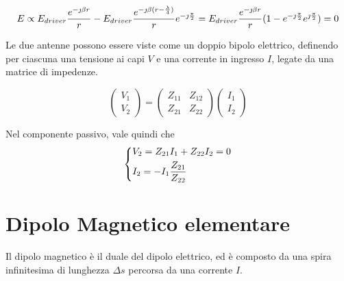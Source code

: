 \begin{equation}
	E
	\propto E_{driver} \frac{e^{-\jmath \beta r}}{r}
	- E_{driver} \frac{e^{-\jmath\beta(r-\frac{\lambda}{4})}}{r} e^{-\jmath\frac{\pi}{2}}
	= E_{driver}\frac{e^{-\jmath \beta r}}{r} (1-e^{-\jmath\frac{\pi}{2}} e^{\jmath\frac{\pi}{2}})
	= 0
\end{equation}

Le due antenne possono essere viste come un doppio bipolo elettrico, definendo per ciascuna una tensione ai capi $V$ e una corrente in ingresso $I$, legate da una matrice di impedenze.

\begin{equation}
	\left(
		\begin{array}{c}
			V_1 \\
			V_2
		\end{array}
	\right)
	= \left(
		\begin{array}{cc}
			Z_{11} & Z_{12} \\
			Z_{21} & Z_{22}
		\end{array}
	\right)
	\left(
		\begin{array}{cc}
			I_1 \\
			I_2
		\end{array}
	\right)
\end{equation}

Nel componente passivo, vale quindi che
\begin{equation}
	\begin{dcases}
		V_2 = Z_{21}I_1+Z_{22}I_2 = 0 \\
		I_2 = -I_1 \frac{Z_{21}}{Z_{22}}
	\end{dcases}
\end{equation}




\clearpage
\section{Dipolo Magnetico elementare}

Il dipolo magnetico è il duale del dipolo elettrico, ed è composto da una spira infinitesima di lunghezza $\Delta s$ percorsa da una corrente $I$.

